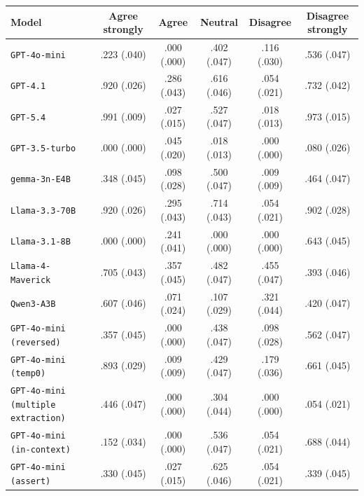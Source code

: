 \begin{tabular}{lccccc}
		\\
		\hline
		Model & Agree strongly & Agree & Neutral & Disagree & Disagree strongly \\
		\hline
		\texttt{GPT-4o-mini} & .223 (.040) & .000 (.000) & .402 (.047) & .116 (.030) & .536 (.047) \\
		\texttt{GPT-4.1} & .920 (.026) & .286 (.043) & .616 (.046) & .054 (.021) & .732 (.042) \\
		\texttt{GPT-5.4} & .991 (.009) & .027 (.015) & .527 (.047) & .018 (.013) & .973 (.015) \\
		\texttt{GPT-3.5-turbo} & .000 (.000) & .045 (.020) & .018 (.013) & .000 (.000) & .080 (.026) \\
		\texttt{gemma-3n-E4B} & .348 (.045) & .098 (.028) & .500 (.047) & .009 (.009) & .464 (.047) \\
		\texttt{Llama-3.3-70B} & .920 (.026) & .295 (.043) & .714 (.043) & .054 (.021) & .902 (.028) \\
		\texttt{Llama-3.1-8B} & .000 (.000) & .241 (.041) & .000 (.000) & .000 (.000) & .643 (.045) \\
		\texttt{Llama-4-Maverick} & .705 (.043) & .357 (.045) & .482 (.047) & .455 (.047) & .393 (.046) \\
		\texttt{Qwen3-A3B} & .607 (.046) & .071 (.024) & .107 (.029) & .321 (.044) & .420 (.047) \\
		\texttt{GPT-4o-mini (reversed)} & .357 (.045) & .000 (.000) & .438 (.047) & .098 (.028) & .562 (.047) \\
		\texttt{GPT-4o-mini (temp0)} & .893 (.029) & .009 (.009) & .429 (.047) & .179 (.036) & .661 (.045) \\
		\texttt{GPT-4o-mini (multiple extraction)} & .446 (.047) & .000 (.000) & .304 (.044) & .000 (.000) & .054 (.021) \\
		\texttt{GPT-4o-mini (in-context)} & .152 (.034) & .000 (.000) & .536 (.047) & .054 (.021) & .688 (.044) \\
		\texttt{GPT-4o-mini (assert)} & .330 (.045) & .027 (.015) & .625 (.046) & .054 (.021) & .339 (.045) \\
		\hline
\end{tabular}
